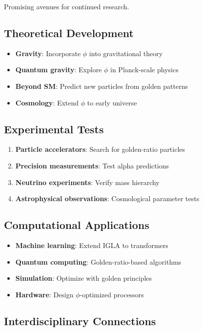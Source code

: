 Promising avenues for continued research.

\subsection{Theoretical Development}

\begin{itemize}
    \item \textbf{Gravity}: Incorporate $\phi$ into gravitational theory
    \item \textbf{Quantum gravity}: Explore $\phi$ in Planck-scale physics
    \item \textbf{Beyond SM}: Predict new particles from golden patterns
    \item \textbf{Cosmology}: Extend $\phi$ to early universe
\end{itemize}

\subsection{Experimental Tests}

\begin{enumerate}
    \item \textbf{Particle accelerators}: Search for golden-ratio particles
    \item \textbf{Precision measurements}: Test alpha predictions
    \item \textbf{Neutrino experiments}: Verify mass hierarchy
    \item \textbf{Astrophysical observations}: Cosmological parameter tests
\end{enumerate}

\subsection{Computational Applications}

\begin{itemize}
    \item \textbf{Machine learning}: Extend IGLA to transformers
    \item \textbf{Quantum computing}: Golden-ratio-based algorithms
    \item \textbf{Simulation}: Optimize with golden principles
    \item \textbf{Hardware}: Design $\phi$-optimized processors
\end{itemize}

\subsection{Interdisciplinary Connections}

